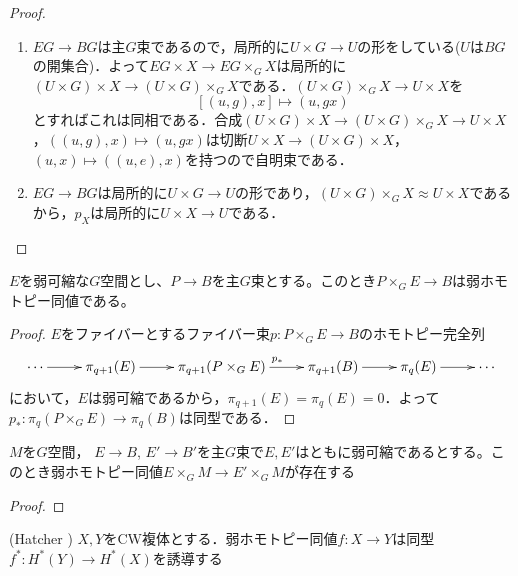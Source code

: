 \begin{proof}
  \:
  \begin{enumerate}
    \item $EG\rightarrow BG$は主$G$束であるので，局所的に$U\times G\rightarrow U$の形をしている($U$は$BG$の開集合)．よって$EG\times X\rightarrow EG\times_G X$は局所的に$(U\times G)\times X\rightarrow (U\times G)\times_GX$である．$(U\times G)\times_GX\rightarrow U\times X$を
    \[
    [(u,g),x] \mapsto (u,gx)
    \]
    とすればこれは同相である．合成$(U\times G)\times X\rightarrow (U\times G)\times_GX\rightarrow U\times X$，$((u,g),x)\mapsto (u,gx)$は切断$U\times X\rightarrow (U\times G)\times X$，$(u,x)\mapsto((u,e),x)$を持つので自明束である．

    \item $EG\rightarrow BG$は局所的に$U\times G\rightarrow U$の形であり，$(U\times G)\times_GX\approx U\times X$であるから，$p_X$は局所的に$U\times X\rightarrow U$である．
  \end{enumerate}
\end{proof}

\begin{lemm}\label{borel const is weak hotmotopy equiv}
  $E$を弱可縮な$G$空間とし、$P\rightarrow B$を主$G$束とする。このとき$P\times_GE\rightarrow B$は弱ホモトピー同値である。
\end{lemm}

\begin{proof}
  $E$をファイバーとするファイバー束$p\colon P\times_GE\rightarrow B$のホモトピー完全列
  \[
  \xymatrix{
    \cdots \ar[r] & \pi_{q+1}(E) \ar[r] & \pi_{q+1}(P\times_GE) \ar[r]^{p_*} & \pi_{q+1}(B) \ar[r] & \pi_q(E) \ar[r] & \cdots
  }
  \]
  において，$E$は弱可縮であるから，$\pi_{q+1}(E)=\pi_{q}(E) = 0$．よって$p_*\colon\pi_q(P\times_GE)\rightarrow \pi_q(B)$は同型である．
\end{proof}

\begin{theo}\label{existance weak homotopy eq}
  $M$を$G$空間， $E\rightarrow B$, $E'\rightarrow B'$を主$G$束で$E,E'$はともに弱可縮であるとする。このとき弱ホモトピー同値$E\times_GM\rightarrow E'\times_GM$が存在する
\end{theo}

\begin{proof}
  
\end{proof}

\begin{theo}(Hatcher \cite{hatcher Top})\label{weak homotopy to cohomology}
  $X,Y$をCW複体とする．弱ホモトピー同値$f\colon X\rightarrow Y$は同型$f^*\colon H^*(Y)\rightarrow H^*(X)$を誘導する
\end{theo}

